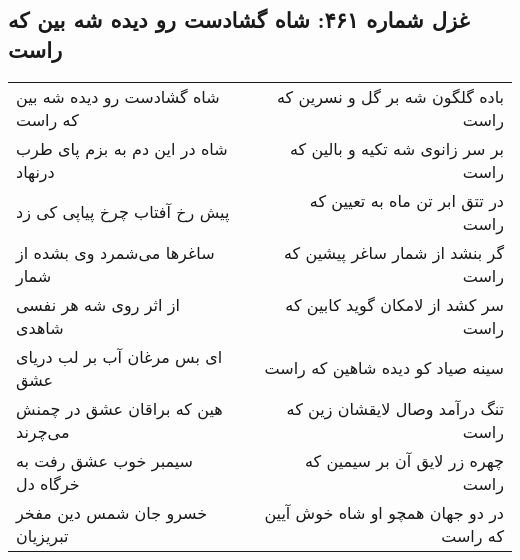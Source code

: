 \begin{center}
\section*{غزل شماره ۴۶۱: شاه گشادست رو دیده شه بین که راست}
\label{sec:0461}
\begin{longtable}{l p{0.5cm} r}
شاه گشادست رو دیده شه بین که راست
&&
باده گلگون شه بر گل و نسرین که راست
\\
شاه در این دم به بزم پای طرب درنهاد
&&
بر سر زانوی شه تکیه و بالین که راست
\\
پیش رخ آفتاب چرخ پیاپی کی زد
&&
در تتق ابر تن ماه به تعیین که راست
\\
ساغرها می‌شمرد وی بشده از شمار
&&
گر بنشد از شمار ساغر پیشین که راست
\\
از اثر روی شه هر نفسی شاهدی
&&
سر کشد از لامکان گوید کابین که راست
\\
ای بس مرغان آب بر لب دریای عشق
&&
سینه صیاد کو دیده شاهین که راست
\\
هین که براقان عشق در چمنش می‌چرند
&&
تنگ درآمد وصال لایقشان زین که راست
\\
سیمبر خوب عشق رفت به خرگاه دل
&&
چهره زر لایق آن بر سیمین که راست
\\
خسرو جان شمس دین مفخر تبریزیان
&&
در دو جهان همچو او شاه خوش آیین که راست
\\
\end{longtable}
\end{center}
